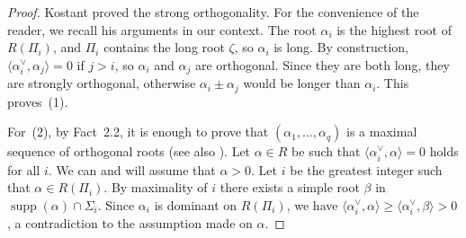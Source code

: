 \documentclass[10pt]{article}
\theoremstyle{definition}
\numberwithin{equation}{section}
\newcommand{\jepPubCoroot}{{\scriptscriptstyle\vee}}
\begin{document}
\begin{proof}
Kostant \cite[Lem.~1.6]{jep93Kos12} proved the strong orthogonality. For the convenience of the reader, we recall his arguments in our context. The root $\alpha_i$ is the highest root of $R(\Pi_i)$, and $\Pi_i$ contains the long root $\zeta$, so $\alpha_i$ is long. By construction, $\langle\alpha_i^\jepPubCoroot,\alpha_j\rangle=0$ if $j>i$, so $\alpha_i$ and $\alpha_j$ are orthogonal. Since they are both long, they are strongly orthogonal, otherwise $\alpha_i\pm\alpha_j$ would be longer than $\alpha_i$. This proves~(1).

For~(2), by Fact~2.2, it is enough to prove that $(\alpha_1,\ldots,\alpha_q)$ is a maximal sequence of orthogonal roots (see also \cite[Th.~1.8]{jep93Kos12}). Let $\alpha\in R$ be such that $\langle\alpha_i^\jepPubCoroot,\alpha\rangle=0$ holds for all $i$. We can and will assume that $\alpha>0$. Let $i$ be the greatest integer such that $\alpha\in R(\Pi_i)$. By maximality of $i$ there exists a simple root $\beta$ in $\operatorname{supp}(\alpha)\cap\Sigma_i$. Since $\alpha_i$ is dominant on $R(\Pi_i)$, we have $\langle\alpha_i^\jepPubCoroot,\alpha\rangle\geqslant\langle\alpha_i^\jepPubCoroot,\beta\rangle>0$, a contradiction to the assumption made on $\alpha$.


\end{proof}
\end{document}

